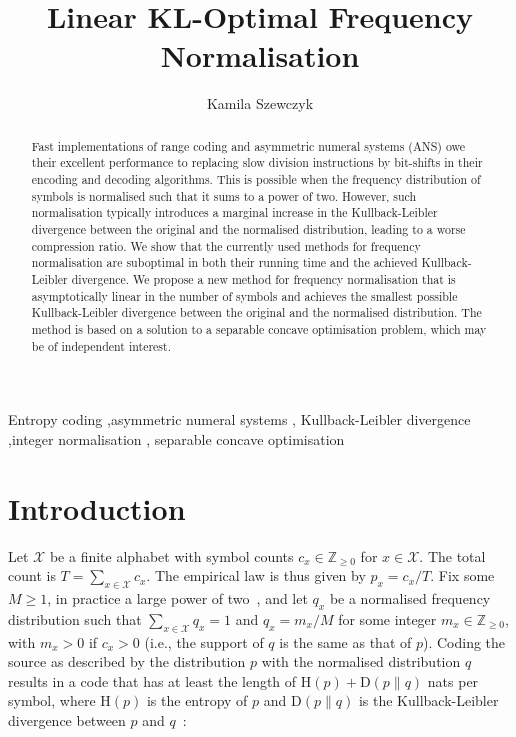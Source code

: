 \documentclass[final,5p]{elsarticle}
\begin{document}
\begin{frontmatter}

\title{Linear KL-Optimal Frequency Normalisation}

\author{Kamila Szewczyk}
\address{Algorithmic Bioinformatics group, Saarland University,
Saarbr\"ucken, Germany}

\begin{keyword}
Entropy coding \sep asymmetric numeral systems \sep
Kullback-Leibler divergence \sep integer normalisation \sep
separable concave optimisation
\end{keyword}

\begin{abstract}
Fast implementations of range coding and asymmetric numeral systems (ANS) owe their excellent performance to replacing slow division instructions by bit-shifts in their encoding and decoding algorithms. This is possible when the frequency distribution of symbols is normalised such that it sums to a power of two. However, such normalisation typically introduces a marginal increase in the Kullback-Leibler divergence between the original and the normalised distribution, leading to a worse compression ratio. We show that the currently used methods for frequency normalisation are suboptimal in both their running time and the achieved Kullback-Leibler divergence. We propose a new method for frequency normalisation that is asymptotically linear in the number of symbols and achieves the smallest possible Kullback-Leibler divergence between the original and the normalised distribution. The method is based on a solution to a separable concave optimisation problem, which may be of independent interest.
\end{abstract}

\end{frontmatter}

\section{Introduction}

Let $\mathcal X$ be a finite alphabet with symbol counts $c_x \in \mathbb{Z}_{\ge 0}$ for $x \in \mathcal X$. The total count is $T = \sum_{x \in \mathcal X} c_x$. The empirical law is thus given by $p_x = c_x / T$. Fix some $M \ge 1$, in practice a large power of two~\cite{Duda2013}, and let $q_x$ be a normalised frequency distribution such that $\sum_{x \in \mathcal X} q_x = 1$ and $q_x = m_x / M$ for some integer $m_x \in \mathbb{Z}_{\ge 0}$, with $m_x > 0$ if $c_x > 0$ (i.e., the support of $q$ is the same as that of $p$). Coding the source as described by the distribution $p$ with the normalised distribution $q$ results in a code that has at least the length of $\mathrm H(p) + \mathrm D(p \| q)$ nats per symbol, where $\mathrm H(p)$ is the entropy of $p$ and $\mathrm D(p \| q)$ is the Kullback-Leibler divergence between $p$ and $q$~\cite{KullbackLeibler1951,CoverThomas2006}:
\end{document}
